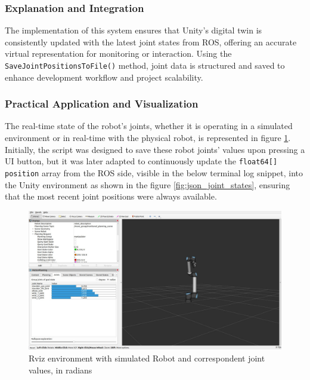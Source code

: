     \subsubsection{Explanation and Integration}
    The implementation of this system ensures that Unity's digital twin is consistently updated with the latest joint states from ROS, offering an accurate virtual representation for monitoring or interaction. Using the \texttt{SaveJointPositionsToFile()} method, joint data is structured and saved to enhance development workflow and project scalability.
    
    
    \subsubsection{Practical Application and Visualization}
    The real-time state of the robot’s joints, whether it is operating in a simulated environment or in real-time with the physical robot, is represented in figure \ref{fig:rviz_joint_states}.
    Initially, the script was designed to save these robot joints' values upon pressing a UI button, but it was later adapted to continuously update the \texttt{float64[] position} array from the ROS side, visible in the below terminal log snippet, into the Unity environment as shown in the figure \ref{fig:json_joint_states}, ensuring that the most recent joint positions were always available.
    
    
    \begin{figure}[h]
        \centering
        \includegraphics[width=\textwidth]{figs/jointStateSubRviz.png.jpg} %
        \caption{Rviz environment with simulated Robot and correspondent joint values, in radians}
        \label{fig:rviz_joint_states}
    \end{figure}
    
